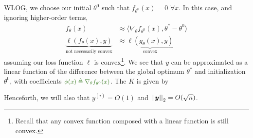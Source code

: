 \documentclass[11pt]{article}
\renewcommand\vec[2][]{\bm{#2}_{#1}}
\begin{document}
WLOG,  we choose our initial $\theta^0$ such that $f_{\theta^0}(x) = 0$ $\forall x$. In this case, and ignoring higher-order terms, 
\begin{align}
	f_{\theta}(x)
		&\approx  \langle \nabla_{\theta} f_{\theta^0}(x), \theta^{*} - \theta^0 \rangle  \\
	\underbrace{ \ell(f_{\theta}(x), y) }_{\text{not necessarily convex}}
		&\approx \underbrace{ \ell(g_{\theta}(x), y) }_{\text{convex}}
\end{align}
assuming our loss function $\ell$ is convex\footnote{Recall that any convex function composed with a linear function is still convex.}. We see that $y$ can be approximated as a linear function of the difference between the global optimum $\theta^*$ and initialization $\theta^0$, with coefficients $\mgreen{\phi(x) \triangleq \nabla_{\theta} f_{\theta^0}(x)}$. The  $K$ is given by 

Henceforth, we will also  that $y^{(i)} = O(1)$ and $\norm{\vec y} = O(\sqrt{n})$. 
\end{document}

